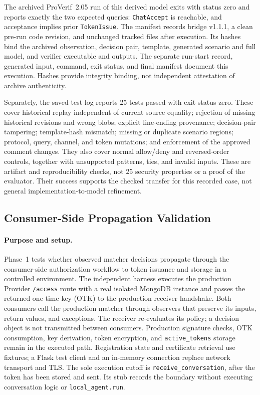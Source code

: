 The archived ProVerif~2.05 run of this derived model exits with status zero
and reports exactly the two expected queries: \texttt{ChatAccept} is
reachable, and acceptance implies prior \texttt{TokenIssue}. The manifest
records bridge v1.1.1, a clean pre-run code revision, and unchanged tracked
files after execution. Its hashes bind the archived observation, decision
pair, template, generated scenario and full model, and verifier executable
and outputs. The separate run-start record, generated input, command,
exit status, and final manifest document this execution. Hashes provide
integrity binding, not independent attestation of archive authenticity.

Separately, the saved test log reports 25 tests passed with exit status zero.
These cover historical replay independent of current source equality;
rejection of missing historical revisions and wrong blobs; explicit
line-ending provenance; decision-pair tampering; template-hash mismatch;
missing or duplicate scenario regions; protocol, query, channel, and token
mutations; and enforcement of the approved comment changes. They also
cover normal allow/deny and reversed-order controls, together with
unsupported patterns, ties, and invalid inputs. These are artifact and
reproducibility checks, not 25 security properties or a proof of the evaluator.
Their success supports the checked transfer for this recorded case, not
general implementation-to-model refinement.

\subsection{Consumer-Side Propagation Validation}
\label{sec:consumer-propagation}

\paragraph{Purpose and setup.}
Phase~1 tests whether observed matcher decisions propagate through the
consumer-side authorization workflow to token issuance and storage in a
controlled environment. The independent harness executes the production
Provider \texttt{/access} route with a real isolated MongoDB instance and
passes the returned one-time key (OTK) to the production receiver handshake.
Both consumers call the production matcher through observers that preserve
its inputs, return values, and exceptions. The receiver re-evaluates its
policy; a decision object is not transmitted between consumers.
Production signature checks, OTK consumption, key derivation, token
encryption, and \texttt{active\_tokens} storage remain in the executed path.
Registration state and certificate retrieval use fixtures; a Flask test
client and an in-memory connection replace network transport and TLS.
The sole execution cutoff is \texttt{receive\_conversation}, after the
token has been stored and sent. Its stub records the boundary without
executing conversation logic or \texttt{local\_agent.run}.


